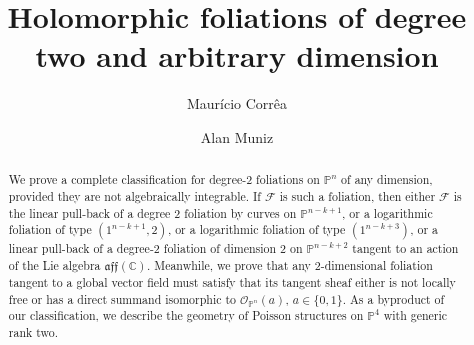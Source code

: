 \documentclass[twoside]{amsart}
\date{}
\numberwithin{equation}{section}
\newcommand{\opn}{{\mathcal O}_{\mathbb{P}^{n}}}
\def\CC{{\mathbb{C}}}
\newcommand{\sF}{\mathscr{F}}
\theoremstyle{definition}
\begin{document}
\title{ Holomorphic foliations of degree two and arbitrary dimension }


\author[M. Corr\^ea]{ Maur\'icio Corr\^ea }
\address[M. Corr\^ea]{Dipartimento di Matematica, Universit\`a degli Studi di Bari,  Via E. Orabona 4, I-70125, Bari, Italy
}

\author[A. Muniz]{Alan Muniz }
\address[A. Muniz]{Universidade Estadual de Campinas (UNICAMP) \\ Instituto de Matemática, Estatística e Computação Científica (IMECC) \\ Departamento de Matem\'atica \\
Rua S\'ergio Buarque de Holanda, 651\\ 13083-859 Campinas-SP, Brasil}
\address{Departamento de Matem\'atica \\ Centro de Ci\^encias Exatas e da Natureza \\ Universidade Federal de Pernambuco \\ Recife - PE, CEP 50740-560, Brasil }
 








\begin{abstract} 
We prove a complete classification for degree-$2$ foliations on $\mathbb{P}^n$ of any dimension, provided they are not algebraically integrable. If $\sF$ is such a foliation, then either $\sF$ is the linear pull-back of a degree 2  foliation by curves on $\mathbb{P}^{n-k+1}$, or a logarithmic foliation of type $(1^{n-k +1},2)$, or a logarithmic foliation of type $(1^{n-k+3})$,  or a linear pull-back of a degree-2 foliation of dimension 2 on $\mathbb{P}^{n-k+2}$ tangent to an action of the Lie algebra $\mathfrak{aff}(\CC)$. Meanwhile, we prove that any 2-dimensional foliation tangent to a global vector field must satisfy that its tangent sheaf either is not locally free or has a direct summand isomorphic to $\opn(a)$, $a\in\{0,1\}$. As a byproduct of our classification, we describe the geometry of Poisson structures on $\mathbb{P}^{4}$ with generic rank two.
\end{abstract}

\maketitle
\end{document}
